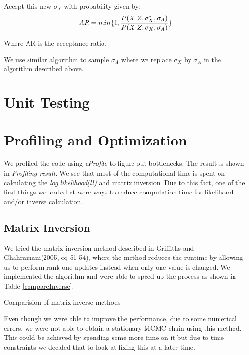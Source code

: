 \documentclass{article}
\begin{document}
Accept this new $\sigma_X$ with probability given by:
\begin{equation}
AR = min\{1,\frac{P(X|Z, \sigma_X^{*}, \sigma_A)}{P(X|Z, \sigma_X,\sigma_A)}\}\\
\end{equation}

Where AR is the acceptance ratio.

We use similar algorithm to sample $\sigma_A$ where we replace $\sigma_X$ by $\sigma_A$ in the algorithm described above.



\section{Unit Testing}

\section{Profiling and Optimization}
We profiled the code using \textit{cProfile} to figure out bottlenecks. The result is shown in \textit{Profiling result}. We see that most of the computational time is spent on calculating the \textit{log likelihood(ll)}  and matrix inversion. Due to this fact, one of the first things we looked at were ways to reduce computation time for likelihood and/or inverse calculation.\\


\subsection{Matrix Inversion}
We tried the matrix inversion method described in Griffiths and Ghahramani(2005, eq 51-54), where the method reduces the runtime by allowing us to perform rank one updates instead when only one value is changed. We implemented the algorithm and were able to speed up the process as shown in Table \ref{compareInverse}.

\begin{table}[ht]
\centering
\caption{Comparision of matrix inverse methods \label{compareInverse}}

\end{table}

Even though we were able to improve the performance, due to some numerical errors, we were not able to obtain a stationary MCMC chain using this method. This could be achieved by spending some more time on it but due to time constraints we decided that to look at fixing this at a later time.\\
\end{document}
